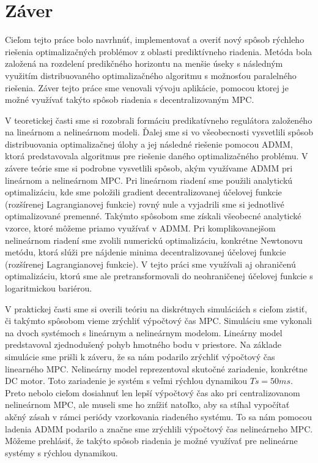 \chapter{Záver}
Cieľom tejto práce bolo navrhnúť, implementovať a overiť nový spôsob rýchleho riešenia optimalizačných problémov z oblasti prediktívneho riadenia. Metóda bola založená na rozdelení predikčného horizontu na menšie úseky s následným využitím distribuovaného optimalizačného algoritmu s možnosťou paralelného riešenia. Záver tejto práce sme venovali vývoju aplikácie, pomocou ktorej je možné využívať takýto spôsob riadenia s decentralizovaným MPC. 

V teoretickej časti sme si rozobrali formáciu predikatívneho regulátora založeného na lineárnom a nelineárnom modeli. Ďalej sme si vo všeobecnosti vysvetlili spôsob distribuovania optimalizačnej úlohy a jej následné riešenie pomocou ADMM, ktorá predstavovala algoritmus pre riešenie daného optimalizačného problému. V závere teórie sme si podrobne vysvetlili spôsob, akým využívame ADMM pri lineárnom a nelineárnom MPC. Pri lineárnom riadení sme použili analytickú optimalizáciu, kde sme položili gradient decentralizovanej účelovej funkcie (rozšírenej Lagrangianovej funkcie) rovný nule a vyjadrili sme si jednotlivé optimalizované premenné. Takýmto spôsobom sme získali všeobecné analytické vzorce, ktoré môžeme priamo využívať v ADMM. Pri komplikovanejšom nelineárnom riadení sme zvolili numerickú optimalizáciu, konkrétne Newtonovu metódu, ktorá slúži pre nájdenie minima decentralizovanej účelovej funkcie (rozšírenej Lagrangianovej funkcie). V tejto práci sme využívali aj ohraničenú optimalizáciu, ktorú sme ale pretransformovali do neohraničenej účelovej funkcie s logaritmickou bariérou.  

V praktickej časti sme si overili teóriu na diskrétnych simuláciách s cieľom zistiť, či takýmto spôsobom vieme zrýchliť výpočtový čas MPC. Simuláciu sme vykonali na dvoch systémoch s lineárnym a nelineárnym modelom. Lineárny model predstavoval zjednodušený pohyb hmotného bodu v priestore. Na základe simulácie sme prišli k záveru, že sa nám podarilo zrýchliť výpočtový čas linearného MPC. Nelineárny model reprezentoval skutočné zariadenie, konkrétne DC motor. Toto zariadenie je systém s veľmi rýchlou dynamikou $Ts = 50ms$. Preto nebolo cieľom dosiahnuť len lepší výpočtový čas ako pri centralizovanom nelineárnom MPC, ale museli sme ho znížiť natoľko, aby sa stíhal vypočítať akčný zásah v rámci periódy vzorkovania riadeného systému. To sa nám pomocou ladenia ADMM podarilo a značne sme zrýchlili výpočtový čas nelineárneho MPC. Môžeme prehlásiť, že takýto spôsob riadenia je možné využívať pre nelineárne systémy s rýchlou dynamikou. 

